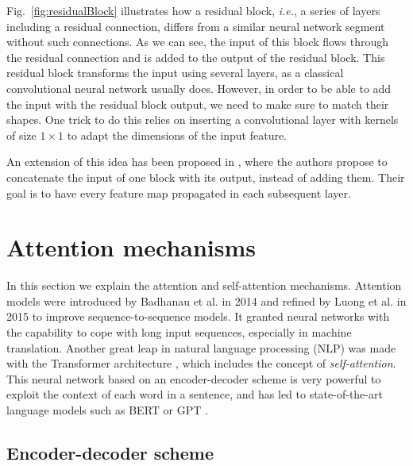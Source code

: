 Fig.~\ref{fig:residualBlock} illustrates how a residual block, \emph{i.e.}, a series of layers including a residual connection, differs from a similar neural network segment without such connections. As we can see, the input of this block flows through the residual connection and is added to the output of the residual block. This residual block transforms the input using several layers, as a classical convolutional neural network usually does. However, in order to be able to add the input with the residual block output, we need to make sure to match their shapes. One trick to do this relies on inserting a convolutional layer with kernels of size $1 \times 1$ to adapt the dimensions of the input feature.

An extension of this idea has been proposed in \cite{huang_densely_2017}, where the authors propose to concatenate the input of one block with its output, instead of adding them. Their goal is to have every feature map propagated in each subsequent layer.

\section{Attention mechanisms}
\label{sec:attentionMechanisms}


In this section we explain the attention and self-attention mechanisms. Attention models were introduced by Badhanau et al. \cite{bahdanau_neural_2015} in 2014 and refined by Luong et al. \cite{luong_effective_2015} in 2015 to improve sequence-to-sequence models. It granted neural networks with the capability to cope with long input sequences, especially in machine translation. Another great leap in natural language processing (NLP) was made with the Transformer architecture \cite{vaswani_attention_2017}, which includes the concept of \textit{self-attention}. This neural network based on an encoder-decoder scheme is very powerful to exploit the context of each word in a sentence, and has led to state-of-the-art language models such as BERT \cite{devlin_bert_2019} or GPT \cite{brown_language_2020}.

\subsection{Encoder-decoder scheme}

